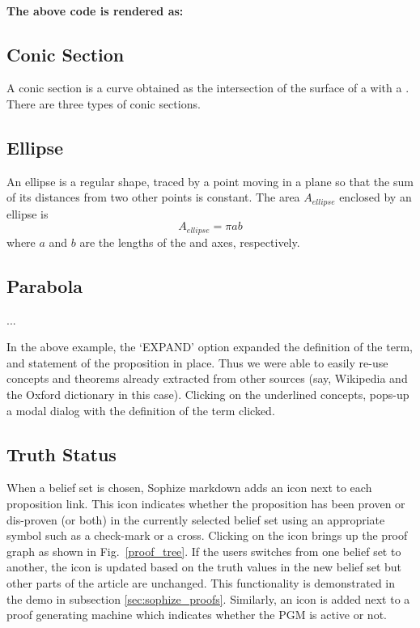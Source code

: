 \documentclass[runningheads]{llncs}
\begin{document}
\paragraph{The above code is rendered as:}
\begin{mdframed}
\section*{Conic Section}
A conic section is a curve obtained as the intersection of the surface of a  with a . There are three types of conic sections.

\subsection*{Ellipse}
An ellipse is a regular  shape, traced by a point moving in a plane so that the sum of its distances from two other points is constant. The area $A_{ellipse}$ enclosed by an ellipse is $$A_{ellipse} = \pi a b$$where $a$ and $b$ are the lengths of the  and  axes, respectively.

\subsection*{Parabola}
...

\end{mdframed}

In the above example, the `EXPAND' option expanded the definition of the term, and statement of the proposition in place. Thus we were able to easily re-use concepts and theorems already extracted from other sources (say, Wikipedia and the Oxford dictionary in this case). Clicking on the underlined concepts, pops-up a modal dialog with the definition of the term clicked.

\subsection{Truth Status}

When a belief set is chosen, Sophize markdown adds an icon next to each proposition link. This icon indicates whether the proposition has been proven or dis-proven (or both) in the currently selected belief set using an appropriate symbol such as a check-mark or a cross. Clicking on the icon brings up the proof graph as shown in Fig.~\ref{proof_tree}. If the users switches from one belief set to another, the icon is updated based on the truth values in the new belief set but other parts of the article are unchanged. This functionality is demonstrated in the demo in subsection \ref{sec:sophize_proofs}. Similarly, an icon is added next to a proof generating machine which indicates whether the PGM is active or not.
\end{document}
